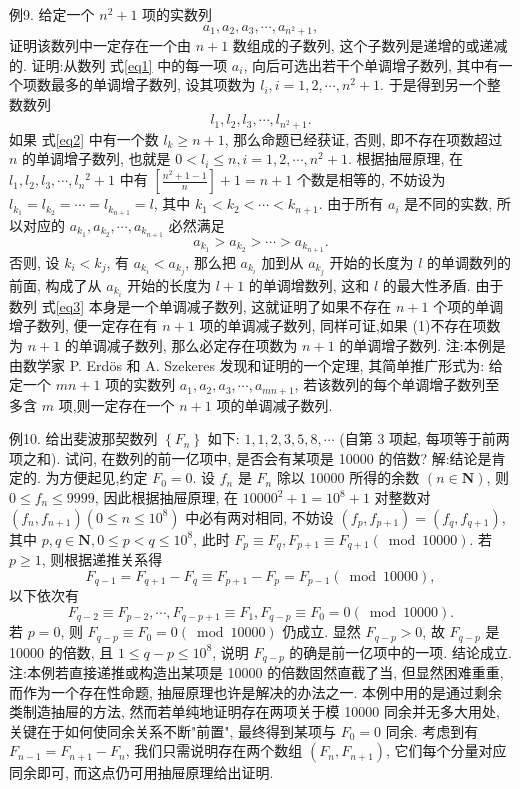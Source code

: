 例9. 给定一个 $n^2+1$ 项的实数列
$$
a_1, a_2, a_3, \cdots, a_{n^2+1}, \label{eq1}
$$
证明该数列中一定存在一个由 $n+1$ 数组成的子数列, 这个子数列是递增的或递减的.
证明:从数列 式\ref{eq1} 中的每一项 $a_i$, 向后可选出若干个单调增子数列, 其中有一个项数最多的单调增子数列, 设其项数为 $l_i, i=1,2, \cdots, n^2+1$. 于是得到另一个整数数列
$$
l_1, l_2, l_3, \cdots, l_{n^2+1} . \label{eq2}
$$
如果 式\ref{eq2} 中有一个数 $l_k \geqslant n+1$, 那么命题已经获证, 否则, 即不存在项数超过 $n$ 的单调增子数列, 也就是 $0<l_i \leqslant n, i=1,2, \cdots, n^2+1$.
根据抽屉原理, 在 $l_1, l_2, l_3, \cdots, l_n{ }^2+1$ 中有 $\left[\frac{n^2+1-1}{n}\right]+1=n+1$ 个数是相等的, 不妨设为 $l_{k_1}=l_{k_2}=\cdots=l_{k_{n+1}}=l$, 其中 $k_1<k_2<\cdots<k_{n+1}$.
由于所有 $a_i$ 是不同的实数, 所以对应的 $a_{k_1}, a_{k_2}, \cdots, a_{k_{n+1}}$ 必然满足
$$
a_{k_1}>a_{k_2}>\cdots>a_{k_{n+1}} . \label{eq3}
$$
否则, 设 $k_i<k_j$, 有 $a_{k_i}<a_{k_j}$, 那么把 $a_{k_i}$ 加到从 $a_{k_j}$ 开始的长度为 $l$ 的单调数列的前面, 构成了从 $a_{k_i}$ 开始的长度为 $l+1$ 的单调增数列, 这和 $l$ 的最大性矛盾.
由于数列 式\ref{eq3} 本身是一个单调减子数列, 这就证明了如果不存在 $n+1$ 个项的单调增子数列, 便一定存在有 $n+1$ 项的单调减子数列, 同样可证,如果 (1)不存在项数为 $n+1$ 的单调减子数列, 那么必定存在项数为 $n+1$ 的单调增子数列.
注:本例是由数学家 P. Erdös 和 A. Szekeres 发现和证明的一个定理, 其简单推广形式为: 给定一个 $m n+1$ 项的实数列 $a_1, a_2, a_3, \cdots, a_{m n+1}$, 若该数列的每个单调增子数列至多含 $m$ 项,则一定存在一个 $n+1$ 项的单调减子数列.



例10. 给出斐波那契数列 $\left\{F_n\right\}$ 如下: $1,1,2,3,5,8, \cdots$ (自第 3 项起, 每项等于前两项之和). 试问, 在数列的前一亿项中, 是否会有某项是 10000 的倍数?
解:结论是肯定的.
为方便起见,约定 $F_0=0$.
设 $f_n$ 是 $F_n$ 除以 10000 所得的余数 $(n \in \mathbf{N})$, 则 $0 \leqslant f_n \leqslant 9999$, 因此根据抽屉原理, 在 $10000^2+1=10^8+1$ 对整数对 $\left(f_n, f_{n+1}\right)\left(0 \leqslant n \leqslant 10^8\right)$ 中必有两对相同, 不妨设 $\left(f_p, f_{p+1}\right)=\left(f_q, f_{q+1}\right)$, 其中 $p, q \in \mathbf{N}, 0 \leqslant p<q \leqslant 10^8$, 此时 $F_p \equiv F_q, F_{p+1} \equiv F_{q+1}(\bmod 10000)$.
若 $p \geqslant 1$, 则根据递推关系得
$$
F_{q-1}=F_{q+1}-F_q \equiv F_{p+1}-F_p=F_{p-1}(\bmod 10000),
$$
以下依次有
$$
F_{q-2} \equiv F_{p-2}, \cdots, F_{q-p+1} \equiv F_1, F_{q-p} \equiv F_0=0(\bmod 10000) .
$$
若 $p=0$, 则 $F_{q-p} \equiv F_0=0(\bmod 10000)$ 仍成立.
显然 $F_{q-p}>0$, 故 $F_{q-p}$ 是 10000 的倍数, 且 $1 \leqslant q-p \leqslant 10^8$, 说明 $F_{q-p}$ 的确是前一亿项中的一项.
结论成立.
注:本例若直接递推或构造出某项是 10000 的倍数固然直截了当, 但显然困难重重, 而作为一个存在性命题, 抽屉原理也许是解决的办法之一.
本例中用的是通过剩余类制造抽屉的方法, 然而若单纯地证明存在两项关于模 10000 同余并无多大用处, 关键在于如何使同余关系不断"前置", 最终得到某项与 $F_0=0$ 同余.
考虑到有 $F_{n-1}=F_{n+1}-F_n$, 我们只需说明存在两个数组 $\left(F_n, F_{n+1}\right)$, 它们每个分量对应同余即可, 而这点仍可用抽屉原理给出证明.



